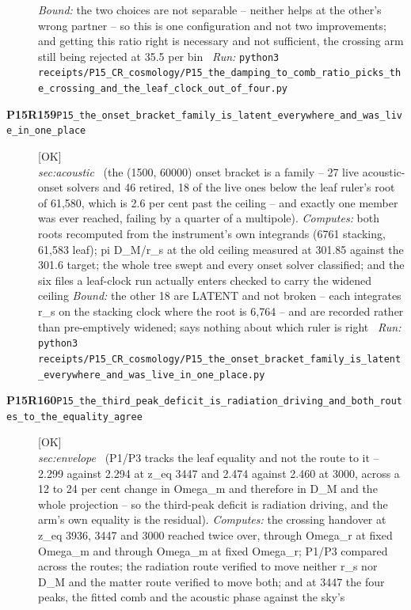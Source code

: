 \begin{description}
 \emph{Bound:} the two choices are not separable -- neither helps at the other's wrong partner -- so this is one configuration and not two improvements; and getting this ratio right is necessary and not sufficient, the crossing arm still being rejected at 35.5 per bin
\ \emph{Run:} \texttt{python3 receipts/P15\_CR\_cosmology/P15\_the\_damping\_to\_comb\_ratio\_picks\_the\_crossing\_and\_the\_leaf\_clock\_out\_of\_four.py}
\item[\rcptlabel{P15_the_onset_bracket_family_is_latent_everywhere_and_was_live_in_one_place}{P15R159}\textbf{P15R159}\quad\texttt{P15\_the\_onset\_bracket\_family\_is\_latent\_everywhere\_and\_was\_live\_in\_one\_place}]\hfill\textsf{[OK]}\\
\textit{sec:acoustic} \ (the (1500, 60000) onset bracket is a family -- 27 live acoustic-onset solvers and 46 retired, 18 of the live ones below the leaf ruler's root of 61,580, which is 2.6 per cent past the ceiling -- and exactly one member was ever reached, failing by a quarter of a multipole). 
\emph{Computes:} both roots recomputed from the instrument's own integrands (6761 stacking, 61,583 leaf); pi D\_M/r\_s at the old ceiling measured at 301.85 against the 301.6 target; the whole tree swept and every onset solver classified; and the six files a leaf-clock run actually enters checked to carry the widened ceiling
 \emph{Bound:} the other 18 are LATENT and not broken -- each integrates r\_s on the stacking clock where the root is 6,764 -- and are recorded rather than pre-emptively widened; says nothing about which ruler is right
\ \emph{Run:} \texttt{python3 receipts/P15\_CR\_cosmology/P15\_the\_onset\_bracket\_family\_is\_latent\_everywhere\_and\_was\_live\_in\_one\_place.py}
\item[\rcptlabel{P15_the_third_peak_deficit_is_radiation_driving_and_both_routes_to_the_equality_agree}{P15R160}\textbf{P15R160}\quad\texttt{P15\_the\_third\_peak\_deficit\_is\_radiation\_driving\_and\_both\_routes\_to\_the\_equality\_agree}]\hfill\textsf{[OK]}\\
\textit{sec:envelope} \ (P1/P3 tracks the leaf equality and not the route to it -- 2.299 against 2.294 at z\_eq 3447 and 2.474 against 2.460 at 3000, across a 12 to 24 per cent change in Omega\_m and therefore in D\_M and the whole projection -- so the third-peak deficit is radiation driving, and the arm's own equality is the residual). 
\emph{Computes:} the crossing handover at z\_eq 3936, 3447 and 3000 reached twice over, through Omega\_r at fixed Omega\_m and through Omega\_m at fixed Omega\_r; P1/P3 compared across the routes; the radiation route verified to move neither r\_s nor D\_M and the matter route verified to move both; and at 3447 the four peaks, the fitted comb and the acoustic phase against the sky's

\end{description}
